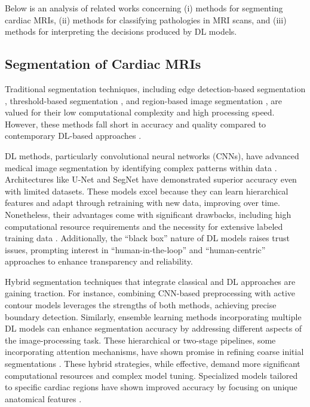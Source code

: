 \documentclass[fleqn,10pt]{wlscirep}
\begin{document}
Below is an analysis of related works concerning (i) methods for segmenting cardiac MRIs, (ii) methods for classifying pathologies in MRI scans, and (iii) methods for interpreting the decisions produced by DL models.

\subsection*{Segmentation of Cardiac MRIs}

Traditional segmentation techniques, including edge detection-based segmentation \cite{Zhao:2005}, threshold-based segmentation \cite{Xu:2010}, and region-based image segmentation \cite{Cigla:2008}, are valued for their low computational complexity and high processing speed. However, these methods fall short in accuracy and quality compared to contemporary DL-based approaches \cite{Liu:2021}.

DL methods, particularly convolutional neural networks (CNNs), have advanced medical image segmentation by identifying complex patterns within data \cite{Berezsky:2024}. Architectures like U-Net \cite{Ronneberger:2015} and SegNet \cite{Badrinarayanan:2017} have demonstrated superior accuracy even with limited datasets. These models excel because they can learn hierarchical features and adapt through retraining with new data, improving over time. Nonetheless, their advantages come with significant drawbacks, including high computational resource requirements and the necessity for extensive labeled training data \cite{Ankenbrand:2021}. Additionally, the ``black box'' nature of DL models raises trust issues, prompting interest in ``human-in-the-loop'' \cite{Radiuk:2022} and ``human-centric'' \cite{Singh:2025} approaches to enhance transparency and reliability.

Hybrid segmentation techniques that integrate classical and DL approaches are gaining traction. For instance, combining CNN-based preprocessing with active contour models leverages the strengths of both methods, achieving precise boundary detection. Similarly, ensemble learning methods incorporating multiple DL models can enhance segmentation accuracy by addressing different aspects of the image-processing task. These hierarchical or two-stage pipelines, some incorporating attention mechanisms, have shown promise in refining coarse initial segmentations \cite{Wang:2023b,Patil:2023}. These hybrid strategies, while effective, demand more significant computational resources and complex model tuning. Specialized models tailored to specific cardiac regions have shown improved accuracy by focusing on unique anatomical features \cite{Wehbe:2023}.
\end{document}
